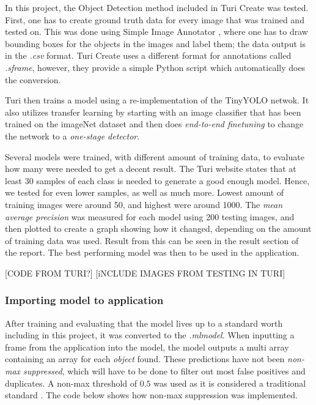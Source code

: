 In this project, the Object Detection method included in Turi Create was tested. First, one
 has to create ground truth data for every image that was trained and tested on. This was
 done using Simple Image Annotator \cite{simpleImage}, where one has to draw bounding
  boxes for the objects in the images and label them; the data output is in the \textit{.csv} format.  Turi Create uses a different format for annotations called \textit{.sframe},
  however, they provide a simple Python script which automatically does the conversion. 

Turi then trains a model using a re-implementation of the TinyYOLO netwok. It also utilizes transfer learning by starting with an image classifier that has been trained on the imageNet dataset and then does \textit{end-to-end finetuning} to change the network to a \textit{one-stage detector}.

Several models were trained, with different amount of training data, to evaluate how many
 were needed to get a decent result. The Turi website states that at least 30 samples of
each class is needed to generate a good enough model. Hence, we tested for even lower
samples, as well as much more. Lowest amount of training images were around 50, and
highest  were around 1000. The \textit{mean average precision} was measured for each model using 200 testing images, and then plotted to create a graph showing how it
 changed, depending on the amount of training data was used. Result from this can be
 seen in the result section of the report. The best performing model was then to be used in the application.

[CODE FROM TURI?]
[iNCLUDE IMAGES FROM TESTING  IN TURI]
\subsubsection{Importing model to application}

After training and evaluating that the model lives up to a standard worth including in this
 project, it was converted to the \textit{.mlmodel}. When inputting a frame from the
application into the model, the model outputs a multi array containing an array for each
  \textit{object} found. These predictions have not been \textit{non-max suppressed},
which will have to be done to filter out most false positives and duplicates. A non-max
threshold of $0.5$ was used as it is considered a traditional standard \cite{nms}. The
code below shows how non-max suppression was implemented. 

